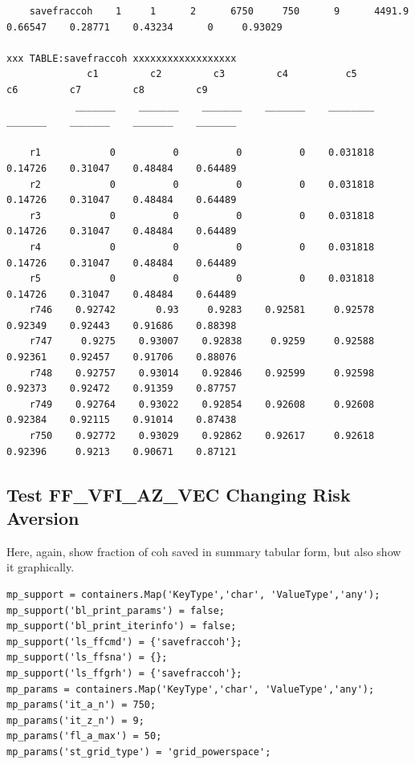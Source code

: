\documentclass[
]{book}
\begin{document}
\begin{verbatim}
    savefraccoh    1     1      2      6750     750      9      4491.9    0.66547    0.28771    0.43234      0     0.93029

xxx TABLE:savefraccoh xxxxxxxxxxxxxxxxxx
              c1         c2         c3         c4          c5         c6         c7         c8         c9   
            _______    _______    _______    _______    ________    _______    _______    _______    _______

    r1            0          0          0          0    0.031818    0.14726    0.31047    0.48484    0.64489
    r2            0          0          0          0    0.031818    0.14726    0.31047    0.48484    0.64489
    r3            0          0          0          0    0.031818    0.14726    0.31047    0.48484    0.64489
    r4            0          0          0          0    0.031818    0.14726    0.31047    0.48484    0.64489
    r5            0          0          0          0    0.031818    0.14726    0.31047    0.48484    0.64489
    r746    0.92742       0.93     0.9283    0.92581     0.92578    0.92349    0.92443    0.91686    0.88398
    r747     0.9275    0.93007    0.92838     0.9259     0.92588    0.92361    0.92457    0.91706    0.88076
    r748    0.92757    0.93014    0.92846    0.92599     0.92598    0.92373    0.92472    0.91359    0.87757
    r749    0.92764    0.93022    0.92854    0.92608     0.92608    0.92384    0.92115    0.91014    0.87438
    r750    0.92772    0.93029    0.92862    0.92617     0.92618    0.92396     0.9213    0.90671    0.87121
\end{verbatim}

\hypertarget{test-ff_vfi_az_vec-changing-risk-aversion}{%
\subsection{Test FF\_VFI\_AZ\_VEC Changing Risk Aversion}\label{test-ff_vfi_az_vec-changing-risk-aversion}}

Here, again, show fraction of coh saved in summary tabular form, but
also show it graphically.

\begin{verbatim}
mp_support = containers.Map('KeyType','char', 'ValueType','any');
mp_support('bl_print_params') = false;
mp_support('bl_print_iterinfo') = false;
mp_support('ls_ffcmd') = {'savefraccoh'};
mp_support('ls_ffsna') = {};
mp_support('ls_ffgrh') = {'savefraccoh'};
mp_params = containers.Map('KeyType','char', 'ValueType','any');
mp_params('it_a_n') = 750;
mp_params('it_z_n') = 9;
mp_params('fl_a_max') = 50;
mp_params('st_grid_type') = 'grid_powerspace';
\end{verbatim}
\end{document}
